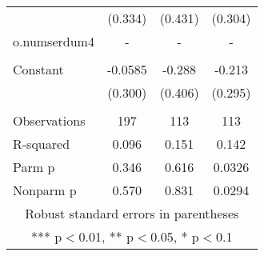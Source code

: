 \documentclass[]{article}
\begin{document}
\begin{tabular}{lccc}
 & (0.334) & (0.431) & (0.304) \\
o.numserdum4 & - & - & - \\
 &  &  &  \\
Constant & -0.0585 & -0.288 & -0.213 \\
 & (0.300) & (0.406) & (0.295) \\
 &  &  &  \\
Observations & 197 & 113 & 113 \\
R-squared & 0.096 & 0.151 & 0.142 \\
Parm p & 0.346 & 0.616 & 0.0326 \\
 Nonparm p & 0.570 & 0.831 & 0.0294 \\ \hline
\multicolumn{4}{c}{ Robust standard errors in parentheses} \\
\multicolumn{4}{c}{ *** p$<$0.01, ** p$<$0.05, * p$<$0.1} \\
\end{tabular}
\end{document}
